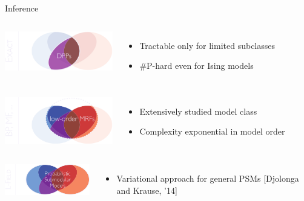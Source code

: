 \documentclass[mathserif]{beamer}
\newcommand{\qcite}[1]{{\scriptsize\color{col2}[#1]}}
\begin{document}
\begin{frame}{Inference}
\vspace{1em}

\begin{minipage}{\textwidth}
\begin{columns}[c]
\includegraphics[width=1.85in]{figures/inf01_exact_horz.pdf}
\begin{itemize}
\item \small{Tractable only for limited subclasses}
\vspace{1em}
\item \#P-hard even for Ising models
\end{itemize}
\end{columns}
\end{minipage}

\vspace{2em}
\begin{minipage}{\textwidth}
\begin{columns}[c]
\includegraphics[width=1.85in]{figures/inf02_loworder_horz.pdf}
\begin{itemize}
\item \small{Extensively studied model class}
\vspace{1em}
\item \small{Complexity exponential in model order}
\end{itemize}
\end{columns}
\end{minipage}

\vspace{2em}
\begin{minipage}{\textwidth}
\begin{columns}[c]
\includegraphics[width=1.85in]{figures/inf03_psm_horz.pdf}
\begin{itemize}
\item Variational approach for general PSMs \qcite{Djolonga and Krause, '14}
\end{itemize}
\end{columns}
\end{minipage}
\end{frame}
\end{document}

